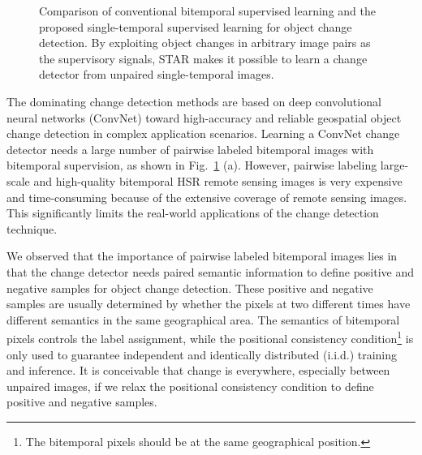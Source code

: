 \documentclass[10pt,twocolumn,letterpaper]{article}
\begin{document}
\begin{figure}
\centering
{}

\caption{Comparison of conventional bitemporal supervised learning and the proposed single-temporal supervised learning for object change detection.
By exploiting object changes in arbitrary image pairs as the supervisory signals, STAR makes it possible to learn a change detector from unpaired single-temporal images.
}
\label{fig:comp}
\end{figure}

The dominating change detection methods are based on deep convolutional neural networks (ConvNet) toward high-accuracy and reliable geospatial object change detection in complex application scenarios.
Learning a ConvNet change detector needs a large number of pairwise labeled bitemporal images with bitemporal supervision, as shown in Fig.~\ref{fig:comp} (a).
However, pairwise labeling large-scale and high-quality bitemporal HSR remote sensing images is very expensive and time-consuming because of the extensive coverage of remote sensing images. 
This significantly limits the real-world applications of the change detection technique.

We observed that the importance of pairwise labeled bitemporal images lies in that the change detector needs paired semantic information to define positive and negative samples for object change detection.
These positive and negative samples are usually determined by whether the pixels at two different times have different semantics in the same geographical area. 
The semantics of bitemporal pixels controls the label assignment, while the positional consistency condition\footnote{The bitemporal pixels should be at the same geographical position.} is only used to guarantee independent and identically distributed (i.i.d.) training and inference.
It is conceivable that change is everywhere, especially between unpaired images, if we relax the positional consistency condition to define positive and negative samples.
\end{document}

